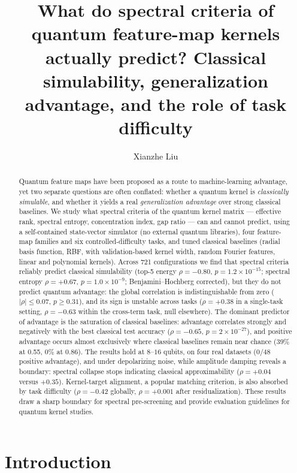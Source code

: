 \documentclass[a4paper,unpublished,onecolumn,nopdfoutputerror,12pt]{quantumarticle}
\title{What do spectral criteria of quantum feature-map kernels actually predict?
Classical simulability, generalization advantage, and the role of task difficulty}
\author{Xianzhe Liu}
\affiliation{School of Physics and Electronics, Hunan University, Changsha 410082, China}
\begin{document}
\maketitle

\begin{abstract}
Quantum feature maps have been proposed as a route to machine-learning advantage, yet
two separate questions are often conflated: whether a quantum kernel is \emph{classically
simulable}, and whether it yields a real \emph{generalization advantage} over strong
classical baselines. We study what spectral criteria of the quantum kernel matrix ---
effective rank, spectral entropy, concentration index, gap ratio --- can and cannot
predict, using a self-contained state-vector simulator (no external quantum libraries),
four feature-map families and six controlled-difficulty tasks, and
tuned classical baselines (radial basis function, RBF, with validation-based kernel
width, random Fourier features, linear and polynomial kernels). Across 721 configurations we find that
spectral criteria reliably predict classical simulability (top-5 energy $\rho=-0.80$,
$p=1.2\times10^{-15}$; spectral entropy $\rho=+0.67$, $p=1.0\times10^{-9}$;
Benjamini--Hochberg corrected), but they do not predict quantum advantage: the global
correlation is indistinguishable from zero ($|\rho|\le0.07$, $p\ge0.31$), and its sign
is unstable across tasks ($\rho=+0.38$ in a single-task setting, $\rho=-0.63$ within
the cross-term task, null elsewhere). The dominant predictor of advantage is the
saturation of classical baselines: advantage correlates strongly and negatively with the
best classical test accuracy ($\rho=-0.65$, $p=2\times10^{-27}$), and positive advantage
occurs almost exclusively where classical baselines remain near chance (39\% at 0.55,
0\% at 0.86). The results hold at $8$--$16$ qubits, on four real datasets ($0/48$
positive advantage), and under depolarizing noise, while amplitude damping reveals a
boundary: spectral collapse stops indicating classical approximability ($\rho=+0.04$
versus $+0.35$). Kernel-target alignment, a popular matching criterion, is also
absorbed by task difficulty ($\rho=-0.42$ globally, $\rho=+0.001$ after
residualization). These results draw a sharp boundary for spectral pre-screening and
provide evaluation guidelines for quantum kernel studies.
\end{abstract}

\section{Introduction}
\label{sec:intro}
\end{document}
